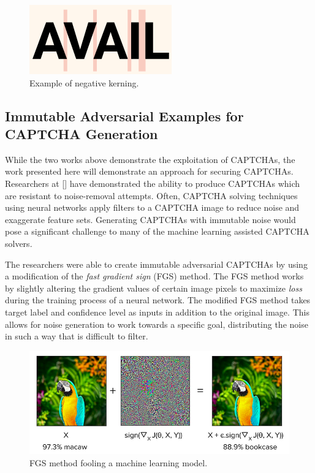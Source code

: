 \documentclass[11pt,conference]{IEEEtran}
\begin{document}
\begin{figure}[htbp]
	\centerline{\includegraphics[scale=0.5]{images/negative-kerning.png}}
	\caption{Example of negative kerning.}
	\label{figure}
\end{figure}

\subsection{Immutable Adversarial Examples for CAPTCHA Generation}
While the two works above demonstrate the exploitation of CAPTCHAs, the work
presented here will demonstrate an approach for securing CAPTCHAs. Researchers
at [] have demonstrated the ability to produce CAPTCHAs which are resistant to
noise-removal attempts. Often, CAPTCHA solving techniques using neural networks
apply filters to a CAPTCHA image to reduce noise and exaggerate feature
sets. Generating CAPTCHAs with immutable noise would pose a significant
challenge to many of the machine learning assisted CAPTCHA solvers.

The researchers were able to create immutable adversarial CAPTCHAs by using a
modification of the \emph{fast gradient sign} (FGS) method. The FGS method
works by slightly altering the gradient values of certain image pixels to
maximize \emph{loss} during the training process of a neural network. The
modified FGS method takes target label and confidence level as inputs in
addition to the original image. This allows for noise generation to work
towards a specific goal, distributing the noise in such a way that is
difficult to filter.

\begin{figure}[htbp]
	\centerline{\includegraphics[scale=0.35]{images/fgsm_technique.png}}
	\caption{FGS method fooling a machine learning model.}
	\label{figure}
\end{figure}
\end{document}

